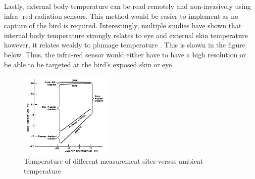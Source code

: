 \documentclass[class=report,11pt,crop=false]{standalone}
\begin{document}
Lastly, external body temperature can be read remotely and non-invasively using infra- red radiation sensors. This method would be easier to implement as no capture of the bird is required. Interestingly, multiple studies have shown that internal body temperature strongly relates to eye and external skin temperature \cite{TEMPMeasuringChallenges} \cite{TEMPSkinSurface} \cite{TEMPThermalImaging} \cite{TEMPBodySurface} however, it relates weakly to plumage temperature \cite{TEMPBodySurface}. This is shown in the figure below. Thus, the infra-red sensor would either have to have a high resolution or be able to be targeted at the bird's exposed skin or eye. 

\begin{figure}[h]
    \centering
    \includegraphics[width=0.4\textwidth]{BodyTemp.png}
    \caption{Temperature of different measurement sites versus ambient temperature \cite{TEMPBodySurface}}
    \label{fig:temprelations}
\end{figure}

\ifstandalone

\printnoidxglossary[type=\acronymtype,nonumberlist]
\fi
\end{document}
